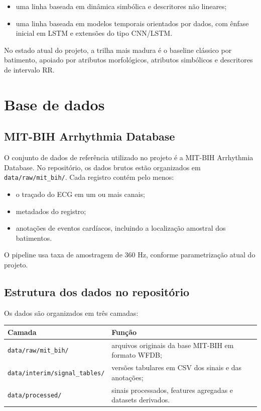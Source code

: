 \documentclass[12pt,a4paper]{article}
\begin{document}
\begin{itemize}
    \item uma linha baseada em din\^amica simb\'olica e descritores n\~ao lineares;
    \item uma linha baseada em modelos temporais orientados por dados, com \^enfase inicial em LSTM e extens\~oes do tipo CNN/LSTM.
\end{itemize}

No estado atual do projeto, a trilha mais madura \'e o baseline cl\'assico por batimento, apoiado por atributos morfol\'ogicos, atributos simb\'olicos e descritores de intervalo RR.

\section{Base de dados}
\subsection{MIT-BIH Arrhythmia Database}
O conjunto de dados de refer\^encia utilizado no projeto \'e a MIT-BIH Arrhythmia Database. No reposit\'orio, os dados brutos est\~ao organizados em \texttt{data/raw/mit\_bih/}. Cada registro cont\'em pelo menos:

\begin{itemize}
    \item o tra\c{c}ado do ECG em um ou mais canais;
    \item metadados do registro;
    \item anota\c{c}\~oes de eventos card\'iacos, incluindo a localiza\c{c}\~ao amostral dos batimentos.
\end{itemize}

O pipeline usa taxa de amostragem de 360 Hz, conforme parametriza\c{c}\~ao atual do projeto.

\subsection{Estrutura dos dados no reposit\'orio}
Os dados s\~ao organizados em tr\^es camadas:

\begin{longtable}{p{} p{}}
\toprule
\textbf{Camada} & \textbf{Fun\c{c}\~ao} \\
\midrule
\texttt{data/raw/mit\_bih/} & arquivos originais da base MIT-BIH em formato WFDB; \\
\texttt{data/interim/signal\_tables/} & vers\~oes tabulares em CSV dos sinais e das anota\c{c}\~oes; \\
\texttt{data/processed/} & sinais processados, features agregadas e datasets derivados. \\
\bottomrule
\end{longtable}
\end{document}
